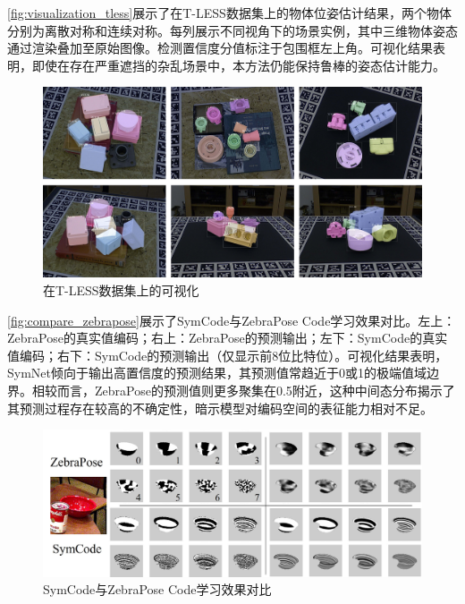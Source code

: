 \autoref{fig:visualization_tless}展示了在T-LESS数据集上的物体位姿估计结果，两个物体分别为离散对称和连续对称。每列展示不同视角下的场景实例，其中三维物体姿态通过渲染叠加至原始图像。检测置信度分值标注于包围框左上角。可视化结果表明，即使在存在严重遮挡的杂乱场景中，本方法仍能保持鲁棒的姿态估计能力。

\begin{figure}[htbp]
        \centerline{\includegraphics[width=1.0\textwidth]{figure/symnet/visualization_tless.jpg}}
        \caption{在T-LESS数据集上的可视化}
        \label{fig:visualization_tless}
\end{figure}

\autoref{fig:compare_zebrapose}展示了SymCode与ZebraPose Code学习效果对比。左上：ZebraPose的真实值编码；右上：ZebraPose的预测输出；左下：SymCode的真实值编码；右下：SymCode的预测输出（仅显示前8位比特位）。可视化结果表明，SymNet倾向于输出高置信度的预测结果，其预测值常趋近于0或1的极端值域边界。相较而言，ZebraPose的预测值则更多聚集在0.5附近，这种中间态分布揭示了其预测过程存在较高的不确定性，暗示模型对编码空间的表征能力相对不足。

\begin{figure}[htbp]
        \centerline{\includegraphics[width=1.0\textwidth]{figure/symnet/compare_with_zebrapose.jpg}}
        \caption{SymCode与ZebraPose Code学习效果对比}
        \label{fig:compare_zebrapose}
\end{figure}

